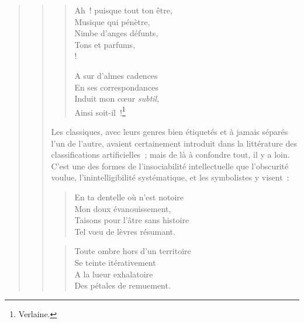 \documentclass[french,twoside]{book} %
\begin{document}
\begin{verse}
\begin{verse}
\begin{verse}
Ah ! puisque tout ton être,\\
Musique qui pénètre,\\
Nimbe d’anges défunts,\\
Tons et parfums,\\!

A sur d’almes cadences\\
En ses correspondances\\
Induit mon cœur \emph{subtil},\\
Ainsi soit-il !\footnote{Verlaine.}\\
\end{verse}

\noindent Les classiques, avec leurs genres bien étiquetés et à jamais séparés l’un de l’autre, avaient certainement introduit dans la littérature des classifications artificielles ; mais de là à confondre tout, il y a loin. C’est une des formes de l’insociabilité intellectuelle que l’obscurité voulue, l’inintelligibilité systématique, et les symbolistes y visent :\par


\begin{verse}
En ta dentelle où n’est notoire\\
Mon doux évanouissement,\\
Taisons pour l’âtre sans histoire\\
Tel vœu de lèvres résumant.\\
\end{verse}



\begin{verse}
Toute ombre hors d’un territoire\\
Se teinte itérativement\\
A la lueur exhalatoire\\
Des pétales de remuement.\\
\end{verse}


\end{verse}
\end{verse}
\end{document}
